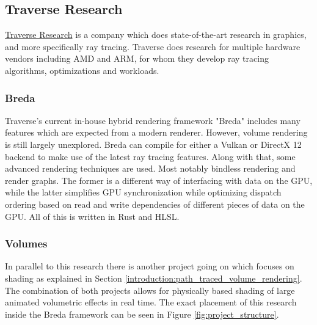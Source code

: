 \clearpage\subsection{Traverse Research} \label{introduction:traverse_research}
\href{https://traverseresearch.nl/}{Traverse Research} is a company which does state-of-the-art research in graphics, and more specifically ray tracing. Traverse does research for multiple hardware vendors including AMD and ARM, for whom they develop ray tracing algorithms, optimizations and workloads.
\subsubsection{Breda} \label{introduction:traverse_research:breda}
Traverse's current in-house hybrid rendering framework "Breda" includes many features which are expected from a modern renderer. However, volume rendering is still largely unexplored. Breda can compile for either a Vulkan or DirectX 12 backend to make use of the latest ray tracing features. Along with that, some advanced rendering techniques are used. Most notably bindless rendering\cite{BindlessRenderingSetup} and render graphs\cite{RenderGraph101}. The former is a different way of interfacing with data on the GPU, while the latter simplifies GPU synchronization while optimizing dispatch ordering based on read and write dependencies of different pieces of data on the GPU. All of this is written in Rust and HLSL.
\subsubsection{Volumes} \label{introduction:traverse_research:volumes}
In parallel to this research there is another project going on which focuses on shading as explained in Section \ref{introduction:path_traced_volume_rendering}. The combination of both projects allows for physically based shading of large animated volumetric effects in real time. The exact placement of this research inside the Breda framework can be seen in Figure \ref{fig:project_structure}.

